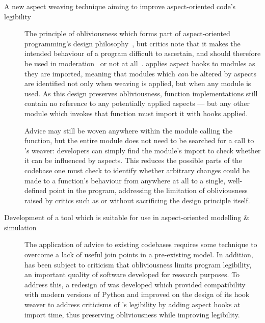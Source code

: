 \begin{description}

  \item[A new aspect weaving technique aiming to improve aspect-oriented code's legibility]
    The principle of obliviousness which forms part of aspect-oriented
    programming's design
    philosophy~\cite{filman2000aspect,kell2008survey,Charfi2006AspectOrientedWL},
    but critics note that it makes the intended behaviour of a program difficult
    to ascertain, and should therefore be used in
    moderation~\cite{leavens2007multiple} or not at
    all~\cite{przybylek2010wrong,Constantinides04aopconsidered}. \pdsf{} applies
    aspect hooks to modules as they are imported, meaning that modules which
    \emph{can} be altered by aspects are identified not only when weaving is
    applied, but when any module is used. As this design preserves
    obliviousness, function implementations still contain no reference to any
    potentially applied aspects --- but any other module which invokes that function
    must import it with hooks applied.

    Advice may still be woven anywhere within the module calling the function,
    but the entire module does not need to be searched for a call to \pdsf{}'s
    weaver: developers can simply find the module's import to check whether it
    can be influenced by aspects. This reduces the possible parts of the
    codebase one must check to identify whether arbitrary changes could be made
    to a function's behaviour from anywhere at all to a single, well-defined
    point in the program, addressing the limitation of obliviousness raised by
    critics such as \citet{leavens2007multiple} or
    \citet{Constantinides04aopconsidered} without sacrificing the design
    principle itself.


  \item[Development of a tool which is suitable for use in aspect-oriented
    modelling \& simulation] The application of advice to existing codebases
    requires some technique to overcome a lack of useful join points in a
    pre-existing model. In addition, \aop{} has been subject to criticism that
    obliviousness limits program legibility, an important quality of software
    developed for research purposes. To address this, a redesign of \pdsf{} was
    developed which provided compatibility with modern versions of Python and
    improved on the design of its hook weaver to address criticisms of \aop{}'s
    legibility by adding aspect hooks at import time, thus preserving
    obliviousness while improving legibility.


\end{description}
